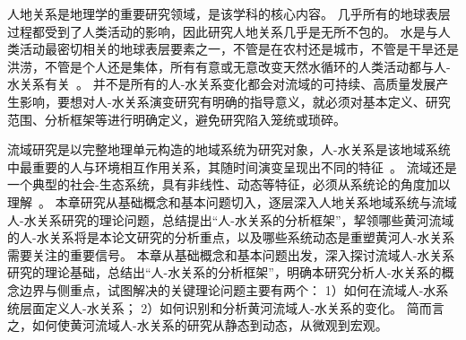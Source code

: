 
人地关系是地理学的重要研究领域，是该学科的核心内容\cite{zhang2022}。
几乎所有的地球表层过程都受到了人类活动的影响，因此研究人地关系几乎是无所不包的。
水是与人类活动最密切相关的地球表层要素之一，不管是在农村还是城市，不管是干旱还是洪涝，不管是个人还是集体，所有有意或无意改变天然水循环的人类活动都与人-水关系有关~\cite{falkenmark2021}。
并不是所有的人-水关系变化都会对流域的可持续、高质量发展产生影响，要想对人-水关系演变研究有明确的指导意义，就必须对基本定义、研究范围、分析框架等进行明确定义，避免研究陷入笼统或琐碎。

流域研究是以完整地理单元构造的地域系统为研究对象，人-水关系是该地域系统中最重要的人与环境相互作用关系，其随时间演变呈现出不同的特征~\cite{wang2019c}。
流域还是一个典型的社会-生态系统，具有非线性、动态等特征，必须从系统论的角度加以理解~\cite{reyers2018,huggins2022}。
本章研究从基础概念和基本问题切入，逐层深入人地关系地域系统与流域人-水关系研究的理论问题，总结提出“人-水关系的分析框架”，挈领哪些黄河流域的人-水关系将是本论文研究的分析重点，以及哪些系统动态是重塑黄河人-水关系需要关注的重要信号。
本章从基础概念和基本问题出发，深入探讨流域人-水关系研究的理论基础，总结出“人-水关系的分析框架”，明确本研究分析人-水关系的概念边界与侧重点，试图解决的关键理论问题主要有两个：
1）如何在流域人-水系统层面定义人-水关系；
2）如何识别和分析黄河流域人-水关系的变化。
简而言之，如何使黄河流域人-水关系的研究从静态到动态，从微观到宏观。
